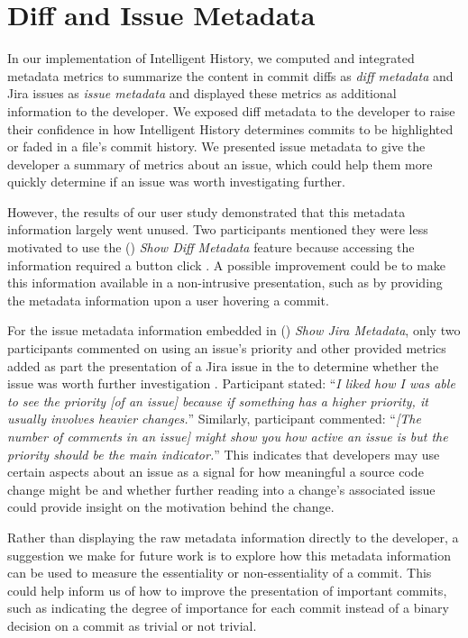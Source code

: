 
\section{Diff and Issue Metadata}

In our implementation of Intelligent History,
we computed and integrated metadata metrics to summarize 
the content in commit diffs as \emph{diff metadata} and Jira issues as \emph{issue metadata} 
and displayed these metrics as additional information to the developer.
We exposed diff metadata to the developer to raise their confidence in how Intelligent History
determines commits to be highlighted or faded in a file's commit history.
We presented issue metadata to give the developer a summary of metrics about
an issue, which could help them more quickly determine if an issue was worth investigating further.

However, the results of our user study demonstrated that this metadata information largely went unused.
Two participants mentioned they were less motivated to use the () \textit{Show Diff Metadata} feature
because accessing the information required a button click .
A possible improvement could be to make this information available in a non-intrusive presentation,
such as by providing the metadata information upon a user hovering a commit.

For the issue metadata information embedded in () \textit{Show Jira Metadata},
only two participants commented on using an issue's priority and other provided metrics added as part the presentation
of a Jira issue in the  to determine whether the issue was worth further investigation .
Participant  stated: 
``\textit{I liked how I was able to see the priority [of an issue] because if something has a higher priority, it usually involves heavier changes.}''
Similarly, participant  commented:
``\textit{[The number of comments in an issue] might show you how active an issue is but the priority should be the main indicator.}''
This indicates that developers may use certain aspects about an issue as a signal 
for how meaningful a source code change might be and whether further reading into a change's associated issue
could provide insight on the motivation behind the change.

Rather than displaying the raw metadata information directly to the developer,
a suggestion we make for future work is to explore how this metadata information
can be used to measure the essentiality or non-essentiality of a commit.
This could help inform us of how to improve the presentation of important
commits, such as indicating the degree of importance for each commit 
instead of a binary decision on a commit as trivial or not trivial.

\endinput

Any text after an \endinput is ignored.
You could put scraps here or things in progress.